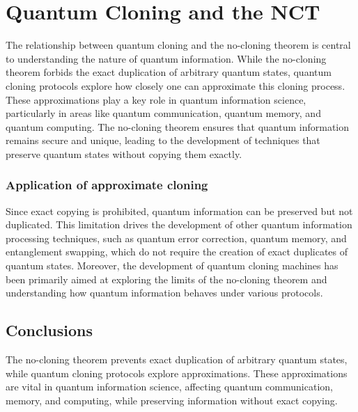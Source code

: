 \documentclass{article}
\theoremstyle{definition}
\theoremstyle{proposition}
\begin{document}
\section{Quantum Cloning and the NCT}
The relationship between quantum cloning and the no-cloning theorem is central to understanding the nature of quantum information. While the no-cloning theorem forbids the exact duplication of arbitrary quantum states, quantum cloning protocols explore how closely one can approximate this cloning process. These approximations play a key role in quantum information science, particularly in areas like quantum communication, quantum memory, and quantum computing. The no-cloning theorem ensures that quantum information remains secure and unique, leading to the development of techniques that preserve quantum states without copying them exactly.

\subsubsection*{Application of approximate cloning}
Since exact copying is prohibited, quantum information can be preserved but not duplicated. This limitation drives the development of other quantum information processing techniques, such as quantum error correction, quantum memory, and entanglement swapping, which do not require the creation of exact duplicates of quantum states.
Moreover, the development of quantum cloning machines has been primarily aimed at exploring the limits of the no-cloning theorem and understanding how quantum information behaves under various protocols.

\subsection*{Conclusions}
The no-cloning theorem prevents exact duplication of arbitrary quantum states, while quantum cloning protocols explore approximations. These approximations are vital in quantum information science, affecting quantum communication, memory, and computing, while preserving information without exact copying.
\end{document}
